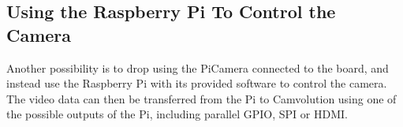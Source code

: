 \subsection{Using the Raspberry Pi To Control the Camera}
Another possibility is to drop using the PiCamera connected to the board,
and instead use the Raspberry Pi with its provided software to control the camera.
The video data can then be transferred from the Pi to Camvolution using one of the possible outputs of the Pi, including parallel GPIO, SPI or HDMI.


